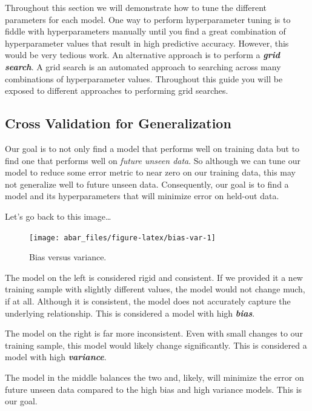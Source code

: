 \documentclass[]{book}
\theoremstyle{definition}
\theoremstyle{definition}
\theoremstyle{definition}
\theoremstyle{remark}
\begin{document}
Throughout this section we will demonstrate how to tune the different
parameters for each model. One way to perform hyperparameter tuning is
to fiddle with hyperparameters manually until you find a great
combination of hyperparameter values that result in high predictive
accuracy. However, this would be very tedious work. An alternative
approach is to perform a \textbf{\emph{grid search}}. A grid search is
an automated approach to searching across many combinations of
hyperparameter values. Throughout this guide you will be exposed to
different approaches to performing grid searches.

\hypertarget{cv}{%
\subsection{Cross Validation for Generalization}\label{cv}}

Our goal is to not only find a model that performs well on training data
but to find one that performs well on \emph{future unseen data}. So
although we can tune our model to reduce some error metric to near zero
on our training data, this may not generalize well to future unseen
data. Consequently, our goal is to find a model and its hyperparameters
that will minimize error on held-out data.

Let's go back to this image\ldots{}

\begin{figure}

{\centering \texttt{[image: abar\_files/figure-latex/bias-var-1]} 

}

\caption{Bias versus variance.}\label{fig:bias-var}
\end{figure}

The model on the left is considered rigid and consistent. If we provided
it a new training sample with slightly different values, the model would
not change much, if at all. Although it is consistent, the model does
not accurately capture the underlying relationship. This is considered a
model with high \textbf{\emph{bias}}.

The model on the right is far more inconsistent. Even with small changes
to our training sample, this model would likely change significantly.
This is considered a model with high \textbf{\emph{variance}}.

The model in the middle balances the two and, likely, will minimize the
error on future unseen data compared to the high bias and high variance
models. This is our goal.
\end{document}
